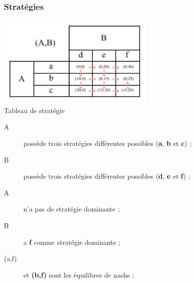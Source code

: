 \subsubsection{Stratégies}


\begin{center}
	\includegraphics[height=4.5cm]{images/strategie.pdf}\\
	Tableau de stratégie
\end{center}
\begin{description}
	\item [A] possède trois stratégies différentes possibles (\textbf{a}, \textbf{b} et \textbf{c}) ;
	\item [B] possède trois stratégies différentes possibles (\textbf{d}, \textbf{e} et \textbf{f}) ;
	\item [A] n'a pas de stratégie dominante ;
	\item [B] a \textbf{f} comme stratégie dominante ;
	\item [(a,f)] et \textbf{(b,f)} sont les équilibres de nashs ;
\end{description}